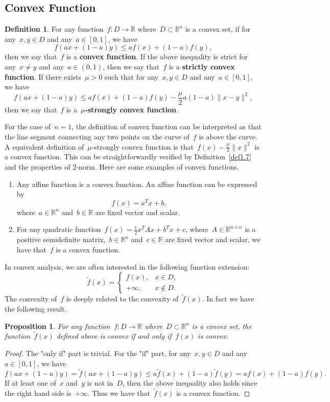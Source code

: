 \documentclass[12pt,a4paper,draft]{article}  %
\newtheorem{proposition}{Proposition}[section]
\theoremstyle{definition}
\newtheorem{definition}{Definition}[section]
\numberwithin{equation}{section}
\newcommand{\RR}{\mathbb{R}}
\begin{document}
\subsection{Convex Function}
\begin{definition} \label{def1.7}
    For any function~$f: D \to \RR$ where~$D \subset \RR^n$ is a convex set, if for any~$x,y \in D$ and any~$a \in \left[ 0,1 \right]$, we have
    $$ f(ax+(1-a)y) \leq a f(x) + (1-a) f(y), $$
    then we say that~$f$ is a \textbf{convex function}. If the above inequality is strict for any~$x \neq y$ and any~$a \in (0,1)$, then we say that~$f$ is a \textbf{strictly convex function}.
    If there exists~$\mu > 0$ such that for any~$x,y \in D$ and any~$a \in \left[ 0,1 \right]$, we have
    $$ f(ax+(1-a)y) \leq a f(x) + (1-a) f(y) - \frac{\mu}{2} a(1-a) \|x-y\|^2, $$
    then we say that~$f$ is a~\textbf{$\mu$-strongly convex function}.
\end{definition}
For the case of~$n=1$, the definition of convex function can be interpreted as that the line segment connecting any two points on the curve of~$f$ is above the curve. 
A equivalent definition of~$\mu$-strongly convex function is that~$f(x) - \frac{\mu}{2} \|x\|^2$ is a convex function. 
This can be straightforwardly verified by Definition~\eqref{def1.7} and the properties of $2$-norm.
Here are some examples of convex functions.
\begin{enumerate}
    \item Any affine function is a convex function. An affine function can be expressed by
    $$ f(x) = a^T x + b, $$
    where~$a \in \RR^n$ and~$b \in \RR$ are fixed vector and scalar.
    \item For any quadratic function~$f(x) = \frac{1}{2} x^T A x + b^T x + c$, where~$A \in \RR^{n \times n}$ is a positive semidefinite matrix,~$b \in \RR^n$ and~$c \in \RR$ are fixed vector and scalar, we have that~$f$ is a convex function.
\end{enumerate}

In convex analysis, we are often interested in the following function extension:
\[
\tilde{f}(x) = \begin{cases}
    f(x), & x \in D, \\
    +\infty, & x \notin D.
\end{cases}
\]
The convexity of~$f$ is deeply related to the convexity of~$\tilde{f}(x)$. In fact we have the following result.
\begin{proposition} \label{prop1.5}
    For any function~$f: D \to \RR$ where~$D \subset \RR^n$ is a convex set, the function~$\tilde{f}(x)$ defined above is convex if and only if~$f(x)$ is convex.
\end{proposition}
\begin{proof}
    The "only if" part is trivial. For the "if" part, for any~$x,y \in D$ and any~$a \in \left[ 0,1 \right]$, we have
    $$ f(ax+(1-a)y) = \tilde{f}(ax+(1-a)y) \leq a \tilde{f}(x) + (1-a) \tilde{f}(y) = a f(x) + (1-a) f(y). $$
    If at least one of~$x$ and~$y$ is not in~$D$, then the above inequality also holds since the right hand side is~$+\infty$.
    Thus we have that~$\tilde{f}(x)$ is a convex function.
\end{proof}
\end{document}
